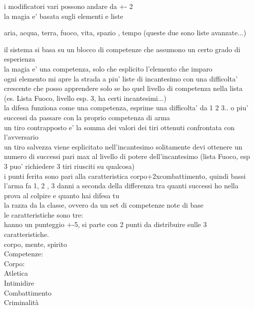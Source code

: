 \documentclass[12pt,a4paper]{book}
\begin{document}
i modificatori vari possono andare da +- 2\\

la magia e' basata sugli elementi e liste

aria, acqua, terra, fuoco, vita, spazio , tempo (queste due sono liste avanzate...)

il sistema	si basa su un blocco di competenze che assumono un certo grado di esperienza\\

la magia e' una competenza, solo che esplicito l'elemento che imparo\\
ogni elemento mi apre la strada a piu' liste di incantesimo con una difficolta' crescente che posso apprendere solo se ho quel livello di competenza nella lista (es. Lista Fuoco, livello esp. 3, ha certi incantesimi...)\\

la difesa funziona come una competenza, esprime una difficolta' da 1 2 3.. o piu' successi da passare con la proprio competenza di arma\\

un tiro contrapposto e' la somma dei valori dei tiri ottenuti confrontata con l'avversario\\

un tiro salvezza viene esplicitato nell'incantesimo solitamente devi ottenere un numero di successi pari max al livello di potere dell'incantesimo (lista Fuoco, esp 3 puo' richiedere 3 tiri riusciti su qualcosa)\\

i punti ferita sono pari alla caratteristica corpo+2xcombattimento, quindi bassi\\

l'arma fa 1, 2 , 3 danni a seconda della differenza tra quanti successi ho nella prova al colpire e quanto hai difesa tu\\

la razza da la classe, ovvero da un set di competenze note di base\\

le caratteristiche sono tre:\\
hanno un punteggio +-5, si parte con 2 punti da distribuire sulle 3 caratteristiche.\\

corpo, mente, spirito\\

Competenze:\\

Corpo:\\
Atletica\\
Intimidire\\
Combattimento\\
Criminalità\\
\end{document}
